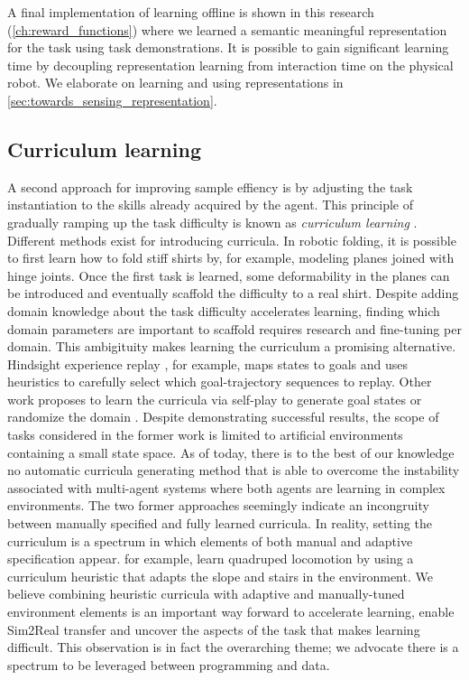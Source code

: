 \documentclass[\home/main.tex]{subfiles}
\begin{document}
A final implementation of learning offline is shown in this research (\cref{ch:reward_functions}) where we learned a semantic meaningful representation for the task using task demonstrations. It is possible to gain significant learning time by decoupling representation learning from interaction time on the physical robot. We elaborate on learning and using representations in \cref{sec:towards_sensing_representation}. 

\subsection{Curriculum learning}
A second approach for improving sample effiency is by adjusting the task instantiation to the skills already acquired by the agent. This principle of gradually ramping up the task difficulty is known as \emph{curriculum learning} \autocite{Selfridge1985}. Different methods exist for introducing curricula. In robotic folding, it is possible to first learn how to fold stiff shirts by, for example, modeling planes joined with hinge joints. Once the first task is learned, some deformability in the planes can be introduced and eventually scaffold the difficulty to a real shirt. Despite adding domain knowledge about the task difficulty accelerates learning, finding which domain parameters are important to scaffold requires research and fine-tuning per domain. This ambigituity makes learning the curriculum a promising alternative.  
Hindsight experience replay \autocite{andrychowicz2017hindsight}, for example, maps states to goals and uses heuristics to carefully select which goal-trajectory sequences to replay. Other work proposes to learn the curricula via self-play to generate goal states \autocite{sukhbaatar2017intrinsic} or randomize the domain \autocite{raparthy2020generating}. Despite demonstrating successful results, the scope of tasks considered in the former work is limited to artificial environments containing a small state space. As of today, there is to the best of our knowledge no automatic curricula generating method that is able to overcome the instability associated with multi-agent systems where both agents are learning in complex environments.
The two former approaches seemingly indicate an incongruity between manually specified and fully learned curricula. In reality, setting the curriculum is a spectrum in which elements of both manual and adaptive specification appear. \textcite{rudin2021learning} for example, learn quadruped locomotion by using a curriculum heuristic that adapts the slope and stairs in the environment. 
We believe combining heuristic curricula with adaptive and manually-tuned environment elements is an important way forward to accelerate learning, enable Sim2Real transfer and uncover the aspects of the task that makes learning difficult. This observation is in fact the overarching theme; we advocate there is a spectrum to be leveraged between programming and data. 
\end{document}
